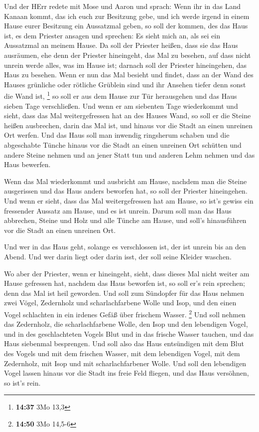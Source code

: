  Und der HErr redete mit Mose und Aaron und sprach:
 Wenn ihr in das Land Kanaan kommt, das ich euch zur
Besitzung gebe, und ich werde irgend in einem Hause eurer Besitzung ein
Aussatzmal geben,  so soll der kommen, des das Haus ist,
es dem Priester ansagen und sprechen: Es sieht mich an, als sei ein
Aussatzmal an meinem Hause.  Da soll der Priester heißen,
dass sie das Haus ausräumen, ehe denn der Priester hineingeht, das Mal
zu besehen, auf dass nicht unrein werde alles, was im Hause ist; darnach
soll der Priester hineingehen, das Haus zu besehen.  Wenn
er nun das Mal besieht und findet, dass an der Wand des Hauses grünliche
oder rötliche Grüblein sind und ihr Ansehen tiefer denn sonst die Wand
ist, \footnote{\textbf{14:37} 3Mo 13,3}  so soll er aus
dem Hause zur Tür herausgehen und das Haus sieben Tage verschließen.
 Und wenn er am siebenten Tage wiederkommt und sieht,
dass das Mal weitergefressen hat an des Hauses Wand,  so
soll er die Steine heißen ausbrechen, darin das Mal ist, und hinaus vor
die Stadt an einen unreinen Ort werfen.  Und das Haus
soll man inwendig ringsherum schaben und die abgeschabte Tünche hinaus
vor die Stadt an einen unreinen Ort schütten  und andere
Steine nehmen und an jener Statt tun und anderen Lehm nehmen und das
Haus bewerfen.

 Wenn das Mal wiederkommt und ausbricht am Hause, nachdem
man die Steine ausgerissen und das Haus anders beworfen hat,
 so soll der Priester hineingehen. Und wenn er sieht,
dass das Mal weitergefressen hat am Hause, so ist's gewiss ein
fressender Aussatz am Hause, und es ist unrein.  Darum
soll man das Haus abbrechen, Steine und Holz und alle Tünche am Hause,
und soll's hinausführen vor die Stadt an einen unreinen Ort.

 Und wer in das Haus geht, solange es verschlossen ist,
der ist unrein bis an den Abend.  Und wer darin liegt
oder darin isst, der soll seine Kleider waschen.

 Wo aber der Priester, wenn er hineingeht, sieht, dass
dieses Mal nicht weiter am Hause gefressen hat, nachdem das Haus
beworfen ist, so soll er's rein sprechen; denn das Mal ist heil
geworden.  Und soll zum Sündopfer für das Haus nehmen
zwei Vögel, Zedernholz und scharlachfarbene Wolle und Isop,
 und den einen Vogel schlachten in ein irdenes Gefäß über
frischem Wasser. \footnote{\textbf{14:50} 3Mo 14,5-6} 
Und soll nehmen das Zedernholz, die scharlachfarbene Wolle, den Isop und
den lebendigen Vogel, und in des geschlachteten Vogels Blut und in das
frische Wasser tauchen, und das Haus siebenmal besprengen.
 Und soll also das Haus entsündigen mit dem Blut des
Vogels und mit dem frischen Wasser, mit dem lebendigen Vogel, mit dem
Zedernholz, mit Isop und mit scharlachfarbener Wolle. 
Und soll den lebendigen Vogel lassen hinaus vor die Stadt ins freie Feld
fliegen, und das Haus versöhnen, so ist's rein.

